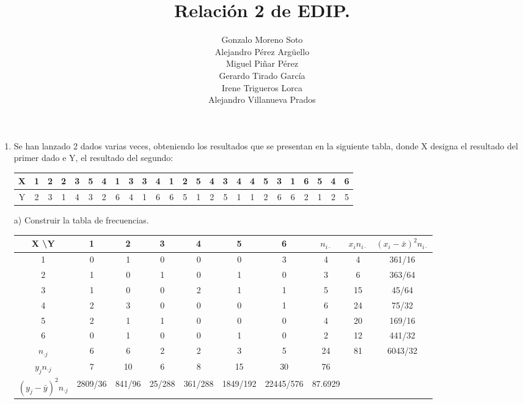 \documentclass[10pt,a4paper]{article}
\author{Gonzalo Moreno Soto\\ Alejandro Pérez Argüello\\ Miguel Piñar Pérez\\ Gerardo Tirado García\\ Irene Trigueros Lorca\\ Alejandro Villanueva Prados}
\title{Relación 2 de EDIP.}
\begin{document}
\maketitle

\newpage
\begin{enumerate}
\item Se han lanzado 2 dados varias veces, obteniendo los resultados que se presentan en la siguiente tabla, donde X designa el resultado del primer dado e Y, el resultado del segundo:

\vspace{0.5cm}
\begin{tabular}{|c|c|c|c|c|c|c|c|c|c|c|c|c|c|c|c|c|c|c|c|c|c|c|c|c|}
\hline 
X & 1 & 2 & 2 & 3 & 5 & 4 & 1 & 3 & 3 & 4 & 1 & 2 & 5 & 4 & 3 & 4 & 4 & 5 & 3 & 1 & 6 & 5 & 4 & 6 \\ 
\hline 
Y & 2 & 3 & 1 & 4 & 3 & 2 & 6 & 4 & 1 & 6 & 6 & 5 & 1 & 2 & 5 & 1 & 1 & 2 & 6 & 6 & 2 & 1 & 2 & 5 \\ 
\hline 
\end{tabular} 

\vspace{0.5cm}
\hspace{0.25cm} a) Construir la tabla de frecuencias.

\vspace{0.5cm}
\begin{tabular}{|c|c|c|c|c|c|c|c|c|c|}
\hline 
X  \textbackslash  Y & 1 & 2 & 3 & 4 & 5 & 6 & $n_{i\cdot}$ & $x_in_{i\cdot}$ & $(x_i- \bar{x})^2n_{i\cdot}$ \\ 
\hline 
1 & 0 & 1 & 0 & 0 & 0 & 3 & 4 & 4 & 361/16 \\ 
\hline 
2 & 1 & 0 & 1 & 0 & 1 & 0 & 3 & 6 & 363/64 \\ 
\hline 
3 & 1 & 0 & 0 & 2 & 1 & 1 & 5 & 15 & 45/64 \\ 
\hline 
4 & 2 & 3 & 0 & 0 & 0 & 1 & 6 & 24 & 75/32 \\ 
\hline 
5 & 2 & 1 & 1 & 0 & 0 & 0 & 4 & 20 & 169/16 \\ 
\hline 
6 & 0 & 1 & 0 & 0 & 1 & 0 & 2 & 12 & 441/32 \\ 
\hline 
$n_{\cdot j}$ & 6 & 6 & 2 & 2 & 3 & 5 & 24 & 81 & 6043/32 \\ 
\hline 
$y_jn_{\cdot j}$ & 7 & 10 & 6 & 8 & 15 & 30 & 76 &  &  \\ 
\hline 
$(y_j-\bar{y})^2n_{\cdot j}$ & 2809/36 & 841/96 & 25/288 & 361/288 & 1849/192 & 22445/576 & 87.6929  &   &   \\ 
\hline 
\end{tabular} 


\end{enumerate}
\end{document}
